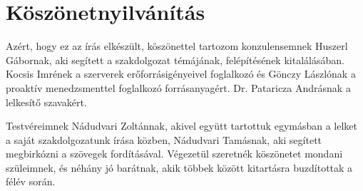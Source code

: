 \chapter*{Köszönetnyilvánítás}

Azért, hogy ez az írás elkészült, köszönettel tartozom konzulensemnek Huszerl Gábornak, aki segített a szakdolgozat témájának, felépítésének kitalálásában. Kocsis Imrének a szerverek erőforrásigényeivel foglalkozó és Gönczy Lászlónak a proaktív menedzsmenttel foglalkozó forrásanyagért. Dr. Pataricza Andrásnak a lelkesítő szavakért.

Testvéreimnek Nádudvari Zoltánnak, akivel együtt tartottuk egymásban a lelket a saját szakdolgozatunk írása közben, Nádudvari Tamásnak, aki segített megbirkózni a szövegek fordításával. Végezetül szeretnék köszönetet mondani szüleimnek, és néhány jó barátnak, akik többek között kitartásra buzdítottak a félév során. 